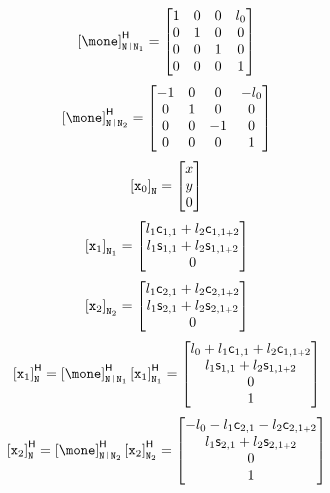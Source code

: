 \documentclass[a4paper,11pt,brazil,fleqn]{article}
\begin{document}
\begin{itemize}
\begin{equation}
\hvct{\mone}_{\ttN \rl \ttN_1} =
\begin{bmatrix}
1 & 0 & 0 & l_0 \\
0 & 1 & 0 & 0 \\
0 & 0 & 1 & 0 \\
0 & 0 & 0 & 1
\end{bmatrix}
\end{equation}
\begin{equation}
\hvct{\mone}_{\ttN \rl \ttN_2} =
\begin{bmatrix}
-1 & 0 & 0 & -l_0 \\
0 & 1 & 0 & 0 \\
0 & 0 & -1 & 0\\
0 & 0 & 0 & 1
\end{bmatrix}
\end{equation}
\begin{equation}
\left[ \mathtt{x}_0 \right]_{\mathtt{N}} =
\begin{bmatrix}
x \\
y \\
0 \\
\end{bmatrix}
\end{equation}
\begin{equation}
\left[ \mathtt{x}_1 \right]_{\mathtt{N}_1} =
\begin{bmatrix}
l_1 \mathsf{c}_{1,1} + l_2 \mathsf{c}_{1,1{\scriptscriptstyle +} 2} \\
l_1 \mathsf{s}_{1,1} + l_2 \mathsf{s}_{1,1{\scriptscriptstyle +} 2} \\
0
\end{bmatrix}
\end{equation}
\begin{equation}
\left[ \mathtt{x}_2 \right]_{\mathtt{N}_2} =
\begin{bmatrix}
l_1 \mathsf{c}_{2,1} + l_2 \mathsf{c}_{2,1{\scriptscriptstyle +} 2} \\
l_1 \mathsf{s}_{2,1} + l_2 \mathsf{s}_{2,1{\scriptscriptstyle +} 2} \\
0
\end{bmatrix}
\end{equation}
\begin{equation}
\hvct{\ttx_1}_{\ttN} = \hvct{\mone}_{\ttN \rl \ttN_1} \hvct{\ttx_1}_{\ttN_1} =
\begin{bmatrix}
l_0 + l_1 \ccos_{1,1} + l_2 \ccos_{1,1\plus 2} \\
l_1 \ssin_{1,1} + l_2 \ssin_{1,1\plus 2} \\
0 \\
1
\end{bmatrix}
\end{equation}
\begin{equation}
\hvct{\ttx_2}_{\ttN} = \hvct{\mone}_{\ttN \rl \ttN_2} \hvct{\ttx_2}_{\ttN_2} =
\begin{bmatrix}
-l_0 - l_1 \ccos_{2,1} - l_2 \ccos_{2,1\plus 2} \\
l_1 \ssin_{2,1} + l_2 \ssin_{2,1\plus 2} \\
0 \\
1
\end{bmatrix}
\end{equation}


\end{itemize}
\end{document}
